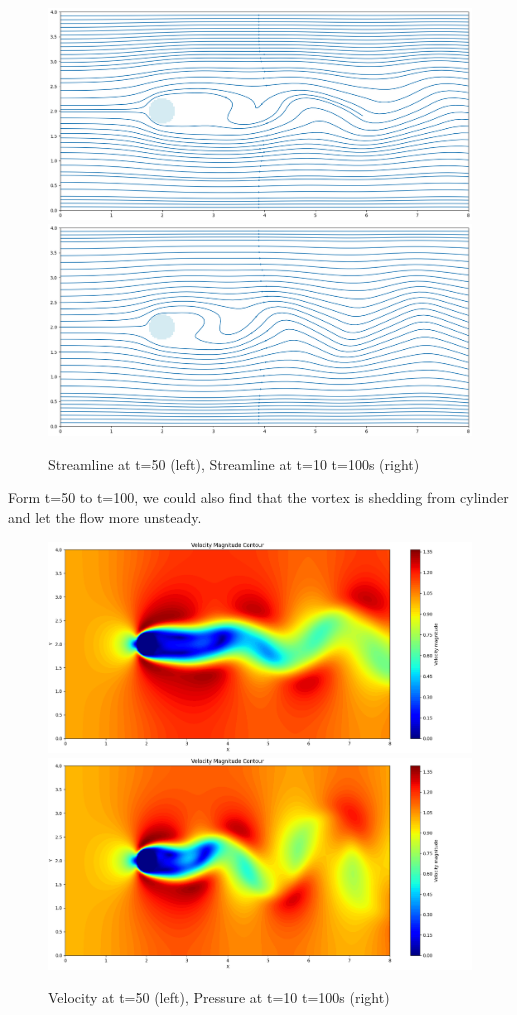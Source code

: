 \documentclass[12pt]{article}
\begin{document}
\begin{figure}[H]
    \centering
    \includegraphics[width=0.45\linewidth]{figure/N32_Re150_8x4_t50/stline_N32_Re150_8x4_t50.jpg}
    \includegraphics[width=0.45\linewidth]{figure/N32_Re150_8x4_t100/stline_N32_Re150_8x4_t100.jpg}
    \caption{Streamline at t=50 (left), Streamline at t=10 t=100s (right)}
\end{figure}

Form t=50 to t=100, we could also find that the vortex is shedding from cylinder and let the flow more unsteady.

\begin{figure}[H]
    \centering
    \includegraphics[width=0.45\linewidth]{figure/N32_Re150_8x4_t50/v_N32_Re150_8x4_t50.jpg}
    \includegraphics[width=0.45\linewidth]{figure/N32_Re150_8x4_t100/v_N32_Re150_8x4_t100.jpg}
    \caption{Velocity at t=50 (left), Pressure at t=10 t=100s (right)}
\end{figure}
\end{document}
